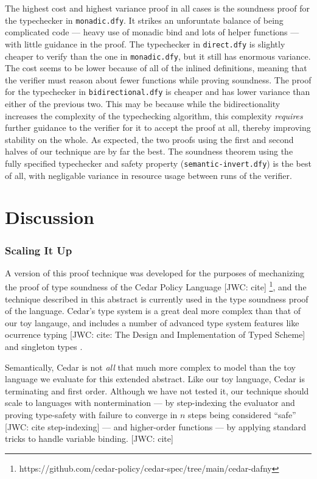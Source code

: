 \documentclass[sigplan,review,screen,anonymous]{acmart}
\newcommand{\comm}[3]{\textcolor{#1}{[#2: #3]}}
\newcommand{\jwc}[1]{\comm{dkgreen}{JWC}{#1}}
\begin{document}
The highest cost and highest variance proof in all cases is the soundness proof for the typechecker in \texttt{monadic.dfy}. It strikes an unforuntate balance of being complicated code --- heavy use of monadic bind and lots of helper functions --- with little guidance in the proof.
The typechecker in \texttt{direct.dfy} is slightly cheaper to verify than the one in \texttt{monadic.dfy}, but it still has enormous variance. The cost seems to be lower because of all of the inlined definitions,
meaning that the verifier must reason about fewer functions while proving soundness.
The proof for the typechecker in \texttt{bidirectional.dfy} is cheaper and has lower variance than either of the previous two. This may be because while the bidirectionality increases the complexity of the typechecking algorithm,
this complexity \emph{requires} further guidance to the verifier for it to accept the proof at all, thereby improving stability on the whole.
As expected, the two proofs using the first and second halves of our technique
are by far the best. The soundness theorem using the fully specified typechecker and safety property (\texttt{semantic-invert.dfy})
is the best of all, with negligable variance in resource usage between runs of the verifier.

\section{Discussion}

\subsubsection*{Scaling It Up}
A version of this proof technique was developed for the purposes of mechanizing the proof of type soundness
of the Cedar Policy Language \jwc{cite} \footnote{https://github.com/cedar-policy/cedar-spec/tree/main/cedar-dafny},
and the technique described in this abstract is currently used in the type soundness proof of the language.
Cedar's type system is a great deal more complex than that of our toy langauge, and includes a number of advanced type system features like ocurrence typing \jwc{cite: The Design and Implementation of Typed Scheme} and
singleton types \cite{https://dl.acm.org/doi/10.5555/645867.670933}.

Semantically, Cedar is not \emph{all} that much more complex to model than the
toy language we evaluate for this extended abstract. Like our toy language,
Cedar is terminating and first order.  Although we have not tested it, our
technique should scale to languages with nontermination --- by step-indexing the
evaluator and proving type-safety with failure to converge in $n$ steps being
considered ``safe'' \jwc{cite step-indexing} --- and higher-order functions ---
by applying standard tricks to handle variable binding. \jwc{cite}
\end{document}
